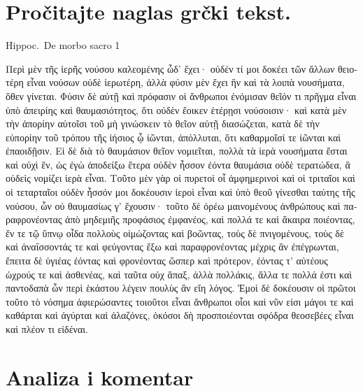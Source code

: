 
\section*{Pročitajte naglas grčki tekst.}

Hippoc.\ De morbo sacro 1


\medskip


{\large

\begin{greek}

\noindent Περὶ μὲν τῆς ἱερῆς νούσου καλεομένης ὧδ’ ἔχει· οὐδέν τί μοι δοκέει τῶν ἄλλων θειοτέρη εἶναι νούσων οὐδὲ ἱερωτέρη, ἀλλὰ φύσιν μὲν ἔχει ἣν καὶ τὰ λοιπὰ νουσήματα, ὅθεν γίνεται. Φύσιν δὲ αὐτῇ καὶ πρόφασιν οἱ ἄνθρωποι ἐνόμισαν θεῖόν τι πρῆγμα εἶναι ὑπὸ ἀπειρίης καὶ θαυμασιότητος, ὅτι οὐδὲν ἔοικεν ἑτέρῃσι νούσοισιν· καὶ κατὰ μὲν τὴν ἀπορίην αὐτοῖσι τοῦ μὴ γινώσκειν τὸ θεῖον αὐτῇ διασώζεται, κατὰ δὲ τὴν εὐπορίην τοῦ τρόπου τῆς ἰήσιος ᾧ ἰῶνται, ἀπόλλυται, ὅτι καθαρμοῖσί τε ἰῶνται καὶ ἐπαοιδῇσιν. Εἰ δὲ διὰ τὸ θαυμάσιον θεῖον νομιεῖται, πολλὰ τὰ ἱερὰ νουσήματα ἔσται καὶ οὐχὶ ἓν, ὡς ἐγὼ ἀποδείξω ἕτερα οὐδὲν ἧσσον ἐόντα θαυμάσια οὐδὲ τερατώδεα, ἃ οὐδεὶς νομίζει ἱερὰ εἶναι. Τοῦτο μὲν γὰρ οἱ πυρετοὶ οἷ ἀμφημερινοὶ καὶ οἱ τριταῖοι καὶ οἱ τεταρταῖοι οὐδὲν ἧσσόν μοι δοκέουσιν ἱεροὶ εἶναι καὶ ὑπὸ θεοῦ γίνεσθαι ταύτης τῆς νούσου, ὧν οὐ θαυμασίως γ’ ἔχουσιν· τοῦτο δὲ ὁρέω μαινομένους ἀνθρώπους καὶ παραφρονέοντας ἀπὸ μηδεμιῆς προφάσιος ἐμφανέος, καὶ πολλά τε καὶ ἄκαιρα ποιέοντας, ἔν τε τῷ ὕπνῳ οἶδα πολλοὺς οἰμώζοντας καὶ βοῶντας, τοὺς δὲ πνιγομένους, τοὺς δὲ καὶ ἀναΐσσοντάς τε καὶ φεύγοντας ἔξω καὶ παραφρονέοντας μέχρις ἂν ἐπέγρωνται, ἔπειτα δὲ ὑγιέας ἐόντας καὶ φρονέοντας ὥσπερ καὶ πρότερον, ἐόντας τ’ αὐτέους ὠχρούς τε καὶ ἀσθενέας, καὶ ταῦτα οὐχ ἅπαξ, ἀλλὰ πολλάκις, ἄλλα τε πολλά ἐστι καὶ παντοδαπὰ ὧν περὶ ἑκάστου λέγειν πουλὺς ἂν εἴη λόγος. Ἐμοὶ δὲ δοκέουσιν οἱ πρῶτοι τοῦτο τὸ νόσημα ἀφιερώσαντες τοιοῦτοι εἶναι ἄνθρωποι οἷοι καὶ νῦν εἰσι μάγοι τε καὶ καθάρται καὶ ἀγύρται καὶ ἀλαζόνες, ὁκόσοι δὴ προσποιέονται σφόδρα θεοσεβέες εἶναι καὶ πλέον τι εἰδέναι.

\end{greek}

}


\section*{Analiza i komentar}

